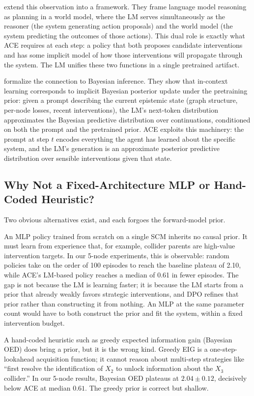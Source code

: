 \documentclass[twoside]{article}
\theoremstyle{plain}
\theoremstyle{definition}
\theoremstyle{remark}
\begin{document}
\citet{hao2023reasoning} extend this observation into a framework. They frame language model reasoning as planning in a world model, where the LM serves simultaneously as the reasoner (the system generating action proposals) and the world model (the system predicting the outcomes of those actions). This dual role is exactly what ACE requires at each step: a policy that both proposes candidate interventions and has some implicit model of how those interventions will propagate through the system. The LM unifies these two functions in a single pretrained artifact.

\citet{xie2022explanation} formalize the connection to Bayesian inference. They show that in-context learning corresponds to implicit Bayesian posterior update under the pretraining prior: given a prompt describing the current epistemic state (graph structure, per-node losses, recent interventions), the LM's next-token distribution approximates the Bayesian predictive distribution over continuations, conditioned on both the prompt and the pretrained prior. ACE exploits this machinery: the prompt at step $t$ encodes everything the agent has learned about the specific system, and the LM's generation is an approximate posterior predictive distribution over sensible interventions given that state.

\subsection{Why Not a Fixed-Architecture MLP or Hand-Coded Heuristic?}

Two obvious alternatives exist, and each forgoes the forward-model prior.

An MLP policy trained from scratch on a single SCM inherits no causal prior. It must learn from experience that, for example, collider parents are high-value intervention targets. In our 5-node experiments, this is observable: random policies take on the order of 100 episodes to reach the baseline plateau of 2.10, while ACE's LM-based policy reaches a median of 0.61 in fewer episodes. The gap is not because the LM is learning faster; it is because the LM starts from a prior that already weakly favors strategic interventions, and DPO refines that prior rather than constructing it from nothing. An MLP at the same parameter count would have to both construct the prior and fit the system, within a fixed intervention budget.

A hand-coded heuristic such as greedy expected information gain (Bayesian OED) does bring a prior, but it is the wrong kind. Greedy EIG is a one-step-lookahead acquisition function; it cannot reason about multi-step strategies like ``first resolve the identification of $X_2$ to unlock information about the $X_3$ collider.'' In our 5-node results, Bayesian OED plateaus at $2.04 \pm 0.12$, decisively below ACE at median $0.61$. The greedy prior is correct but shallow.
\end{document}
